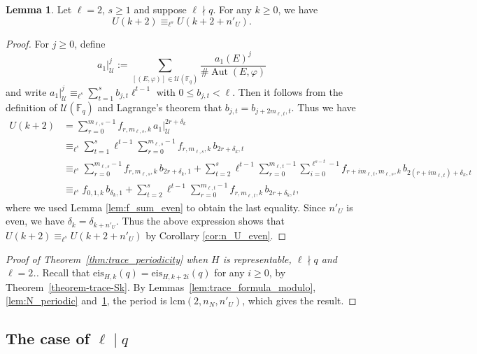 \documentclass[10pt]{article}
\theoremstyle{definition}
\newtheorem{lemma}[theorem]{Lemma}
\let\phi\varphi
\DeclareMathOperator\Aut{Aut}
\renewcommand{\:}{\colon}
\newcommand{\bF}{\mathbb{F}}
\begin{document}
\begin{lemma}\label{lem:U_periodic_even}
    Let $\ell=2$, $s \geq 1$ and suppose $\ell \nmid q$. For any $k \geq 0$, we have
    \[
    U(k+2) \equiv_{\ell^s} U(k + 2 + n'_U).
    \]
\end{lemma}

\begin{proof}
    For $j \geq 0$, define
    \[
    a_1|_{\mathcal U}^{j} := \sum_{[(E,\phi)] \in \mathcal U(\bF_q)} \frac{a_1(E)^{j}}{\# \Aut(E,\phi)}
    \]
    and write $a_1|_{\mathcal U}^{j} \equiv_{\ell^s} \sum_{t=1}^s b_{j,t} \ell^{t-1}$ with $0 \leq b_{j,t} < \ell$. Then it follows from the definition of $\mathcal U(\bF_q)$ and Lagrange's theorem that $b_{j,t} = b_{j+2m_{\ell,t},t}$. Thus we have
    \begin{align*}
    U(k+2) &= \sum_{r=0}^{m_{\ell,s}-1} f_{r,m_{\ell,s},k} \,a_1|_{\mathcal U}^{2r+\delta_k} \\
    &\equiv_{\ell^s} \sum_{t=1}^s \ell^{t-1} \sum_{r=0}^{m_{\ell,s}-1} f_{r,m_{\ell,s},k}\, b_{2r+\delta_k,t} \\
    &\equiv_{\ell^s} \sum_{r=0}^{m_{\ell,s}-1} f_{r,m_{\ell,s},k} \,b_{2r+\delta_k,1}+\sum_{t=2}^s \ell^{t-1} \sum_{r=0}^{m_{\ell,t}-1} \sum_{i=0}^{\ell^{s-t}-1} f_{r+im_{\ell,t},m_{\ell,s},k} \,b_{2(r+im_{\ell,t})+\delta_k,t} \\
    &\equiv_{\ell^s} f_{0,1,k} \,b_{\delta_k,1}+\sum_{t=2}^s \ell^{t-1} \sum_{r=0}^{m_{\ell,t}-1} f_{r,m_{\ell,t},k} \,b_{2r+\delta_k,t},
    \end{align*}
    where we used Lemma \ref{lem:f_sum_even} to obtain the last equality. Since $n'_U$ is even, we have $\delta_k = \delta_{k+n'_U}$. Thus the above expression shows that $U(k+2) \equiv_{\ell^s} U(k+2+n'_U)$ by Corollary \ref{cor:n_U_even}.
\end{proof}


\begin{proof}[Proof of Theorem~\ref{thm:trace_periodicity} when $H$ is representable, $\ell \nmid q$ and $\ell =2$.] 

Recall that $\mathrm{eis}_{H,k}(q)=\mathrm{eis}_{H,k+2i}(q)$ for any $i \geq 0$, by Theorem~\ref{theorem-trace-Sk}.
By Lemmas~\ref{lem:trace_formula_modulo}, \ref{lem:N_periodic} and~\ref{lem:U_periodic_even}, the period is $\text{lcm}(2,n_N,n'_{U})$, which gives the result. 
\end{proof}  


\subsection{The case of \texorpdfstring{$\ell \mid q$}{ellmidq}}\label{sec:ell=p}
\end{document}
